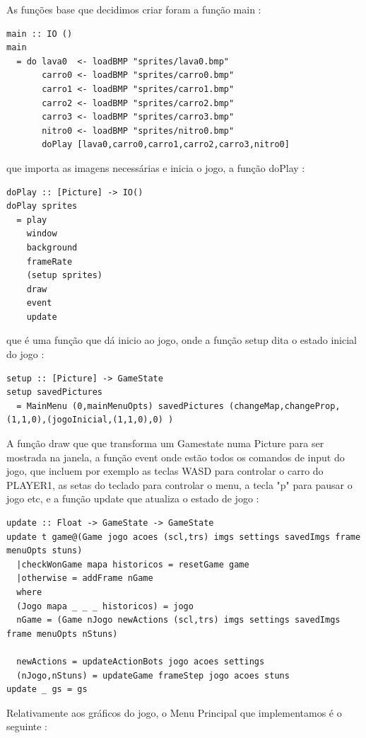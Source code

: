 \documentclass[a4paper]{report} %
\begin{document}
As funções base que decidimos criar foram a função main :

\begin{verbatim}
main :: IO ()
main
  = do lava0  <- loadBMP "sprites/lava0.bmp"
       carro0 <- loadBMP "sprites/carro0.bmp"
       carro1 <- loadBMP "sprites/carro1.bmp"
       carro2 <- loadBMP "sprites/carro2.bmp"
       carro3 <- loadBMP "sprites/carro3.bmp"
       nitro0 <- loadBMP "sprites/nitro0.bmp"
       doPlay [lava0,carro0,carro1,carro2,carro3,nitro0]
\end{verbatim}
que importa as imagens necessárias e inicia o jogo, a função doPlay :

\begin{verbatim}
doPlay :: [Picture] -> IO()
doPlay sprites
  = play
    window
    background
    frameRate
    (setup sprites)
    draw
    event
    update
\end{verbatim}
que é uma função que dá inicio ao jogo, onde a função setup dita o estado inicial do jogo :

\begin{verbatim}
setup :: [Picture] -> GameState
setup savedPictures
  = MainMenu (0,mainMenuOpts) savedPictures (changeMap,changeProp,(1,1,0),(jogoInicial,(1,1,0),0) )
\end{verbatim}

A função draw que que transforma um Gamestate numa Picture para ser mostrada na janela, a função event onde estão todos os comandos de input do jogo, que incluem por exemplo as teclas WASD para controlar o carro do PLAYER1, as setas do teclado para controlar o menu, a tecla "p" para pausar o jogo etc, e a função update que atualiza o estado de jogo :

\begin{verbatim}
update :: Float -> GameState -> GameState
update t game@(Game jogo acoes (scl,trs) imgs settings savedImgs frame menuOpts stuns)
  |checkWonGame mapa historicos = resetGame game
  |otherwise = addFrame nGame
  where
  (Jogo mapa _ _ _ historicos) = jogo
  nGame = (Game nJogo newActions (scl,trs) imgs settings savedImgs frame menuOpts nStuns)

  newActions = updateActionBots jogo acoes settings
  (nJogo,nStuns) = updateGame frameStep jogo acoes stuns
update _ gs = gs
\end{verbatim}

Relativamente aos gráficos do jogo, o Menu Principal que implementamos é o seguinte : 
\end{document}
